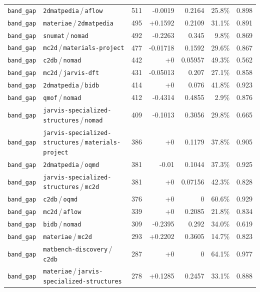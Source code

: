 \begin{longtable}{llrrrrr}
\texttt{band\_gap} & \texttt{2dmatpedia}\,/\,\texttt{aflow} & 511 & -0.0019 & 0.2164 & 25.8\% & 0.898 \\
\texttt{band\_gap} & \texttt{materiae}\,/\,\texttt{2dmatpedia} & 495 & +0.1592 & 0.2109 & 31.1\% & 0.891 \\
\texttt{band\_gap} & \texttt{snumat}\,/\,\texttt{nomad} & 492 & -0.2263 & 0.345 & 9.8\% & 0.869 \\
\texttt{band\_gap} & \texttt{mc2d}\,/\,\texttt{materials-project} & 477 & -0.01718 & 0.1592 & 29.6\% & 0.867 \\
\texttt{band\_gap} & \texttt{c2db}\,/\,\texttt{nomad} & 442 & +0 & 0.05957 & 49.3\% & 0.562 \\
\texttt{band\_gap} & \texttt{mc2d}\,/\,\texttt{jarvis-dft} & 431 & -0.05013 & 0.207 & 27.1\% & 0.858 \\
\texttt{band\_gap} & \texttt{2dmatpedia}\,/\,\texttt{bidb} & 414 & +0 & 0.076 & 41.8\% & 0.923 \\
\texttt{band\_gap} & \texttt{qmof}\,/\,\texttt{nomad} & 412 & -0.4314 & 0.4855 & 2.9\% & 0.876 \\
\texttt{band\_gap} & \texttt{jarvis-specialized-structures}\,/\,\texttt{nomad} & 409 & -0.1013 & 0.3056 & 29.8\% & 0.665 \\
\texttt{band\_gap} & \texttt{jarvis-specialized-structures}\,/\,\texttt{materials-project} & 386 & +0 & 0.1179 & 37.8\% & 0.905 \\
\texttt{band\_gap} & \texttt{2dmatpedia}\,/\,\texttt{oqmd} & 381 & -0.01 & 0.1044 & 37.3\% & 0.925 \\
\texttt{band\_gap} & \texttt{jarvis-specialized-structures}\,/\,\texttt{mc2d} & 381 & +0 & 0.07156 & 42.3\% & 0.828 \\
\texttt{band\_gap} & \texttt{c2db}\,/\,\texttt{oqmd} & 376 & +0 & 0 & 60.6\% & 0.929 \\
\texttt{band\_gap} & \texttt{mc2d}\,/\,\texttt{aflow} & 339 & +0 & 0.2085 & 21.8\% & 0.834 \\
\texttt{band\_gap} & \texttt{bidb}\,/\,\texttt{nomad} & 309 & -0.2395 & 0.292 & 34.0\% & 0.619 \\
\texttt{band\_gap} & \texttt{materiae}\,/\,\texttt{mc2d} & 293 & +0.2202 & 0.3605 & 14.7\% & 0.823 \\
\texttt{band\_gap} & \texttt{matbench-discovery}\,/\,\texttt{c2db} & 287 & +0 & 0 & 64.1\% & 0.977 \\
\texttt{band\_gap} & \texttt{materiae}\,/\,\texttt{jarvis-specialized-structures} & 278 & +0.1285 & 0.2457 & 33.1\% & 0.888 \\

\end{longtable}
